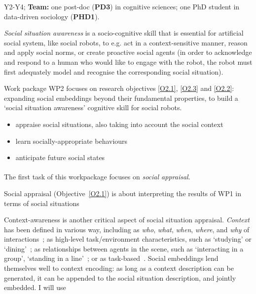 \begin{framed}
 Y2-Y4; {\bf Team:} one post-doc ({\bf PD3}) in
cognitive sciences; one PhD student in data-driven sociology ({\bf PHD1}).
\end{framed}


\emph{Social situation awareness} is a socio-cognitive skill that is essential for
artificial social system, like social robots, to e.g.  act in a
context-sensitive manner, reason and apply social norms, or create proactive
social agents (in order to acknowledge and respond to a human who would like
to engage with the robot, the robot must first adequately model and
recognise the corresponding social situation).

Work package WP2 focuses on research objectives \ref{O2.1}, \ref{O2.3} and \ref{O2.2}:
expanding social embeddings beyond their fundamental properties, to build a
`social situation awareness' cognitive skill for social robots.

\begin{itemize}
    \item appraise social situations, also taking into account the social context
    \item learn socially-appropriate behaviours
    \item anticipate future social states
\end{itemize}



\paragraph{\TBA}

The first task of this workpackage focuses on \emph{social appraisal}.

Social appraisal (Objective~\ref{O2.1}) is about interpreting the results of WP1
in terms of social situations

Context-awareness is another critical aspect of social situation appraisal.
\emph{Context} has been defined in various way, including as \emph{who},
\emph{what}, \emph{when}, \emph{where}, and \emph{why} of
interactions~\cite{vinciarelli2009social}; as high-level task/environment
characteristics, such as `studying' or `dining'~\cite{nigam2015social}; as
relationships between agents in the scene, such as `interacting in a group',
`standing in a line'~\cite{althaus2004navigation}; or as
task-based~\cite{castellano2012detecting}. Social embeddings lend themselves
well to context encoding: as long as a context description can be generated, it
can be appended to the social situation description, and jointly embedded.
I will use 
%


